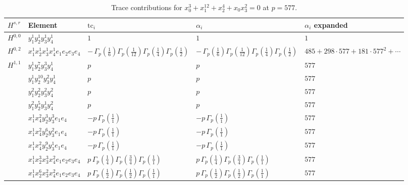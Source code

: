 \documentclass[11pt]{article}
\begin{document}
\begin{table}[ht]
\centering
\caption{Trace contributions for $x_0^{3} + x_1^{12} + x_2^{4} + x_0 x_3^{2} = 0$ at $p=577$.}\label{tab:deformed-30}
\renewcommand{\arraystretch}{1.1}
{\scriptsize
\begin{tabular}{@{}lllll@{}}
\toprule
$H^{s,r}$ & Element & $\mathrm{tc}_i$ & $\alpha_i$ & $\alpha_i$ expanded \\
\midrule
$H^{0,0}$ & $y_{1}^{1} y_{2}^{1} y_{3}^{1} y_{4}^{1}$ & $1$ & $1$ & $1$ \\
\midrule
$H^{0,2}$ & $x_{1}^{1} x_{2}^{1} x_{3}^{1} x_{4}^{1}  e_{1} e_{2} e_{3} e_{4}$ & $- \, \Gamma_p \left( \frac{1}{6} \right) \Gamma_p \left( \frac{1}{12} \right) \Gamma_p \left( \frac{1}{4} \right) \Gamma_p \left( \frac{1}{2} \right)$ & $- \, \Gamma_p \left( \frac{1}{6} \right) \Gamma_p \left( \frac{1}{12} \right) \Gamma_p \left( \frac{1}{4} \right) \Gamma_p \left( \frac{1}{2} \right)$ & $485{+}298{\cdot}577{+}181{\cdot}577^{2}{+}\cdots$ \\
\midrule
$H^{1,1}$ & $y_{1}^{1} y_{2}^{7} y_{3}^{3} y_{4}^{1}$ & $p \,$ & $p \,$ & $577$ \\
 & $y_{1}^{1} y_{2}^{10} y_{3}^{2} y_{4}^{1}$ & $p \,$ & $p \,$ & $577$ \\
 & $y_{1}^{2} y_{2}^{2} y_{3}^{2} y_{4}^{2}$ & $p \,$ & $p \,$ & $577$ \\
 & $y_{1}^{2} y_{2}^{5} y_{3}^{1} y_{4}^{2}$ & $p \,$ & $p \,$ & $577$ \\
 & $x_{1}^{1} x_{4}^{2} y_{2}^{3} y_{3}^{3} e_{1} e_{4}$ & $- p \, \Gamma_p \left( \frac{1}{1} \right)$ & $- p \, \Gamma_p \left( \frac{1}{1} \right)$ & $577$ \\
 & $x_{1}^{1} x_{4}^{2} y_{2}^{6} y_{3}^{2} e_{1} e_{4}$ & $- p \, \Gamma_p \left( \frac{1}{1} \right)$ & $- p \, \Gamma_p \left( \frac{1}{1} \right)$ & $577$ \\
 & $x_{1}^{1} x_{4}^{2} y_{2}^{9} y_{3}^{1} e_{1} e_{4}$ & $- p \, \Gamma_p \left( \frac{1}{1} \right)$ & $- p \, \Gamma_p \left( \frac{1}{1} \right)$ & $577$ \\
 & $x_{1}^{1} x_{2}^{3} x_{3}^{3} x_{4}^{2}  e_{1} e_{2} e_{3} e_{4}$ & $p \, \Gamma_p \left( \frac{1}{4} \right) \Gamma_p \left( \frac{3}{4} \right) \Gamma_p \left( \frac{1}{1} \right)$ & $p \, \Gamma_p \left( \frac{1}{4} \right) \Gamma_p \left( \frac{3}{4} \right) \Gamma_p \left( \frac{1}{1} \right)$ & $577$ \\
 & $x_{1}^{1} x_{2}^{6} x_{3}^{2} x_{4}^{2}  e_{1} e_{2} e_{3} e_{4}$ & $p \, \Gamma_p \left( \frac{1}{2} \right) \Gamma_p \left( \frac{1}{2} \right) \Gamma_p \left( \frac{1}{1} \right)$ & $p \, \Gamma_p \left( \frac{1}{2} \right) \Gamma_p \left( \frac{1}{2} \right) \Gamma_p \left( \frac{1}{1} \right)$ & $577$ \\

\end{tabular}}
\end{table}
\end{document}
